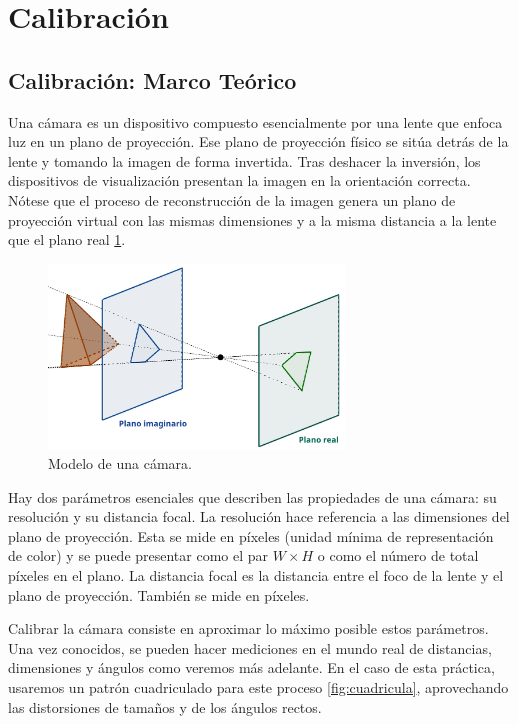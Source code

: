 \documentclass[12pt]{article}
\begin{document}
\newpage

\section{Calibración}

\subsection{Calibración: Marco Teórico}

Una cámara es un dispositivo compuesto esencialmente por una lente que enfoca luz en un plano de proyección.
Ese plano de proyección físico se sitúa detrás de la lente y tomando la imagen de forma invertida. Tras deshacer la inversión, los dispositivos de visualización presentan la imagen en la orientación correcta.
Nótese que el proceso de reconstrucción de la imagen genera un plano de proyección virtual con las mismas dimensiones y a la misma distancia a la lente que el plano real \ref{fig:Modelo_camara}.

\begin{figure}[h!]
    \centering
    \includegraphics[width=0.7\textwidth]{images_calibracion/Modelo_camara.png}  %
    \caption{Modelo de una cámara.}
    \label{fig:Modelo_camara}
\end{figure}

Hay dos parámetros esenciales que describen las propiedades de una cámara: su resolución y su distancia focal. 
La resolución hace referencia a las dimensiones del plano de proyección.
Esta se mide en píxeles (unidad mínima de representación de color) y se puede presentar como el par $W \times H$ o como el número de total píxeles en el plano.
La distancia focal es la distancia entre el foco de la lente y el plano de proyección. También se mide en píxeles.

Calibrar la cámara consiste en aproximar lo máximo posible estos parámetros. Una vez conocidos, se pueden hacer mediciones en el mundo real de distancias, dimensiones y ángulos como veremos más adelante. 
En el caso de esta práctica, usaremos un patrón cuadriculado para este proceso \ref{fig:cuadricula}, aprovechando las distorsiones de tamaños y de los ángulos rectos.
\end{document}
